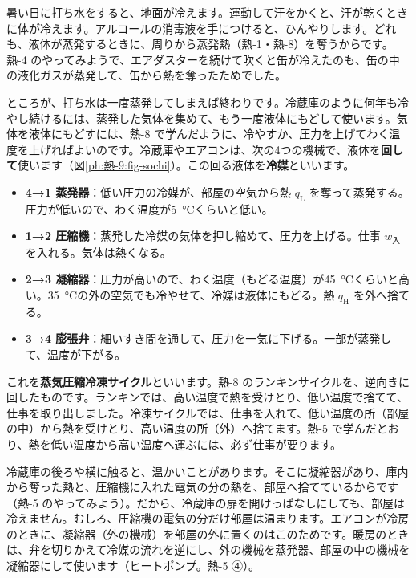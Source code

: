 
\leavevmode\label{ph:熱-9:sec1}暑い日に打ち水をすると、地面が冷えます。運動して汗をかくと、汗が乾くときに体が冷えます。アルコールの消毒液を手につけると、ひんやりします。どれも、液体が蒸発するときに、周りから蒸発熱（熱-1・熱-8）を奪うからです。熱-4 のやってみようで、エアダスターを続けて吹くと缶が冷えたのも、缶の中の液化ガスが蒸発して、缶から熱を奪ったためでした。

ところが、打ち水は一度蒸発してしまえば終わりです。冷蔵庫のように何年も冷やし続けるには、蒸発した気体を集めて、もう一度液体にもどして使います。気体を液体にもどすには、熱-8 で学んだように、冷やすか、圧力を上げてわく温度を上げればよいのです。冷蔵庫やエアコンは、次の4つの機械で、液体を\textbf{回して}使います（図\ref{ph:熱-9:fig-sochi}）。この回る液体を\textbf{冷媒}といいます。
\begin{bkfigure}
\qxjcycle
{}
\label{ph:熱-9:fig-sochi}
\end{bkfigure}
\begin{itemize}[label={\color{bkTheme}●}, leftmargin=1.6\zw, itemsep=2pt, topsep=2pt]
\item \textbf{4→1 蒸発器}：低い圧力の冷媒が、部屋の空気から熱 $q_{\mathrm L}$ を奪って蒸発する。圧力が低いので、わく温度が\qty{5}{\celsius}くらいと低い。
\item \textbf{1→2 圧縮機}：蒸発した冷媒の気体を押し縮めて、圧力を上げる。仕事 $w_{\text{入}}$ を入れる。気体は熱くなる。
\item \textbf{2→3 凝縮器}：圧力が高いので、わく温度（もどる温度）が\qty{45}{\celsius}くらいと高い。\qty{35}{\celsius}の外の空気でも冷やせて、冷媒は液体にもどる。熱 $q_{\mathrm H}$ を外へ捨てる。
\item \textbf{3→4 膨張弁}：細いすき間を通して、圧力を一気に下げる。一部が蒸発して、温度が下がる。
\end{itemize}
これを\textbf{蒸気圧縮冷凍サイクル}といいます。熱-8 のランキンサイクルを、逆向きに回したものです。ランキンでは、高い温度で熱を受けとり、低い温度で捨てて、仕事を取り出しました。冷凍サイクルでは、仕事を入れて、低い温度の所（部屋の中）から熱を受けとり、高い温度の所（外）へ捨てます。熱-5 で学んだとおり、熱を低い温度から高い温度へ運ぶには、必ず仕事が要ります。

\begin{phmijika}[冷蔵庫の後ろが温かいわけ]
冷蔵庫の後ろや横に触ると、温かいことがあります。そこに凝縮器があり、庫内から奪った熱と、圧縮機に入れた電気の分の熱を、部屋へ捨てているからです（熱-5 のやってみよう）。だから、冷蔵庫の扉を開けっぱなしにしても、部屋は冷えません。むしろ、圧縮機の電気の分だけ部屋は温まります。エアコンが冷房のときに、凝縮器（外の機械）を部屋の外に置くのはこのためです。暖房のときは、弁を切りかえて冷媒の流れを逆にし、外の機械を蒸発器、部屋の中の機械を凝縮器にして使います（ヒートポンプ。熱-5 ④）。
\end{phmijika}

